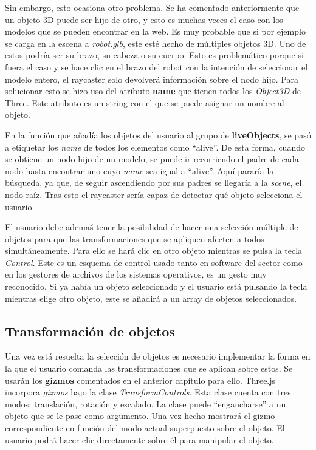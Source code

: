 Sin embargo, esto ocasiona otro problema. Se ha comentado anteriormente que un objeto 3D puede ser hijo de otro, y esto es muchas veces el caso con los modelos que se pueden encontrar en la web. Es muy probable que si por ejemplo se carga en la escena a \textit{robot.glb}, este esté hecho de múltiples objetos 3D. Uno de estos podría ser su brazo, su cabeza o su cuerpo. Esto es problemático porque si fuera el caso y se hace clic en el brazo del robot con la intención de seleccionar el modelo entero, el raycaster solo devolverá información sobre el nodo hijo. Para solucionar esto se hizo uso del atributo \textbf{name} que tienen todos los \textit{Object3D} de Three. Este atributo es un string con el que se puede asignar un nombre al objeto. 

En la función que añadía los objetos del usuario al grupo de \textbf{liveObjects}, se pasó a etiquetar los \textit{name} de todos los elementos como ``alive''. De esta forma, cuando se obtiene un nodo hijo de un modelo, se puede ir recorriendo el padre de cada nodo hasta encontrar uno cuyo \textit{name} sea igual a ``alive''. Aquí pararía la búsqueda, ya que, de seguir ascendiendo por sus padres se llegaría a la \textit{scene}, el nodo raíz. Tras esto el raycaster sería capaz de detectar qué objeto selecciona el usuario. 

El usuario debe ademaś tener la posibilidad de hacer una selección múltiple de objetos para que las transformaciones que se apliquen afecten a todos simultáneamente. Para ello se hará clic en otro objeto mientras se pulsa la tecla \textit{Control}. Este es un esquema de control usado tanto en software del sector como en los gestores de archivos de los sistemas operativos, es un gesto muy reconocido. Si ya había un objeto seleccionado y el usuario está pulsando la tecla mientras elige otro objeto, este se añadirá a un array de objetos seleccionados.

\subsection{Transformación de objetos}

Una vez está resuelta la selección de objetos es necesario implementar la forma en la que el usuario comanda las transformaciones que se aplican sobre estos. Se usarán los \textbf{gizmos} comentados en el anterior capítulo para ello. Three.js incorpora \textit{gizmos} bajo la clase \textit{TransformControls}. Esta clase cuenta con tres modos: translación, rotación y escalado. La clase puede ``engancharse'' a un objeto que se le pase como argumento. Una vez hecho mostrará el gizmo correspondiente en función del modo actual superpuesto sobre el objeto. El usuario podrá hacer clic directamente sobre él para manipular el objeto.


